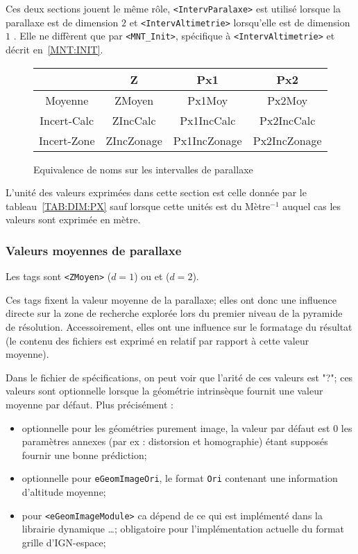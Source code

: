 Ces deux sections jouent le m\^eme r\^ole, {\tt <IntervParalaxe>}
est utilis\'e lorsque la parallaxe est de dimension $2$ et 
{\tt <IntervAltimetrie>} lorsqu'elle est de dimension $1$ .
Elle ne diff\`erent que par {\tt <MNT\_Init>}, sp\'ecifique \`a  
{\tt <IntervAltimetrie>} et d\'ecrit en~\ref{MNT:INIT}.


\begin{figure}
\begin{tabular} {  c c c c  } \\  \hline
               & Z & Px1 & Px2\\ \hline
       Moyenne & ZMoyen & Px1Moy & Px2Moy\\ \hline
       Incert-Calc & ZIncCalc & Px1IncCalc & Px2IncCalc\\ \hline
       Incert-Zone & ZIncZonage & Px1IncZonage & Px2IncZonage\\ \hline
\end{tabular}
\caption {Equivalence de noms sur les intervalles de parallaxe}
\label{TAB:EQUIV:IntervPx}
\end{figure}


L'unit\'e  des valeurs exprim\'ees dans cette section 
est celle donn\'ee par le tableau~\ref{TAB:DIM:PX} sauf lorsque 
cette unit\'es est du  M\`etre$^{-1}$ auquel cas les valeurs  sont exprim\'ee
en m\`etre.



\subsubsection{Valeurs moyennes de parallaxe}
Les tags sont  {\tt   <ZMoyen>} ($d=1$) ou {\tt <Px1Moy>} et
{\tt <Px2Moy>} ($d=2$).

Ces tags fixent la valeur moyenne de la parallaxe; elles ont donc
une influence directe sur la zone de recherche explor\'ee lors
du premier niveau de la pyramide de r\'esolution. Accessoirement,
elles ont une influence sur le formatage du r\'esultat (le contenu
des fichiers est exprim\'e en relatif par rapport \`a cette valeur moyenne).

Dans le fichier de sp\'ecifications, on peut voir que
l'arit\'e de ces valeurs est "?"; ces valeurs sont optionnelle lorsque
la g\'eom\'etrie intrins\`eque  fournit  une valeur moyenne par d\'efaut.
Plus pr\'ecis\'ement :

\begin{itemize}
    \item optionnelle pour les g\'eom\'etries purement image, la valeur
          par d\'efaut est $0$  les param\`etres annexes (par ex : distorsion
          et homographie) \'etant suppos\'es
          fournir une bonne pr\'ediction;

    \item optionnelle pour {\tt eGeomImageOri}, le format {\tt Ori} contenant
          une information d'altitude moyenne;

    \item pour {\tt <eGeomImageModule>} ca d\'epend de ce qui est impl\'ement\'e
          dans la librairie dynamique \dots  ; obligatoire pour l'impl\'ementation
          actuelle du format grille d'IGN-espace;
\end{itemize}

